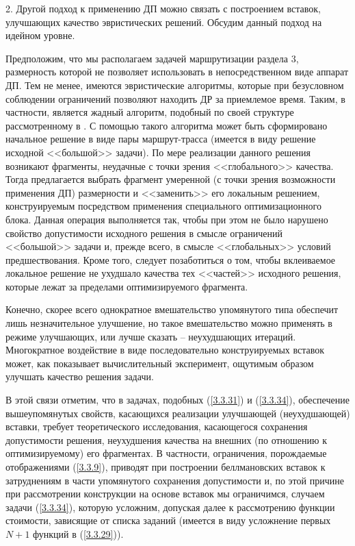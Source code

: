 \documentclass[11pt,twoside,openany]{report}
\begin{document}
{2. Другой подход к применению ДП можно связать с построением вставок, улучшающих
качество эвристических решений.
Обсудим данный подход на идейном уровне.

Предположим, что мы располагаем задачей маршрутизации раздела 3,
размерность
которой не позволяет использовать в непосредственном виде аппарат ДП.
Тем не
менее, имеются эвристические  алгоритмы, которые
при безусловном соблюдении ограничений
позволяют находить ДР за приемлемое время.
Таким, в частности,
является жадный алгоритм, подобный по своей структуре рассмотренному в
\cite{Cha8`}.
С помощью такого алгоритма может быть сформировано начальное
решение в виде пары маршрут-трасса
(имеется в виду решение исходной <<большой>> задачи).
По мере реализации данного решения возникают фрагменты,
неудачные с
точки зрения <<глобального>> качества.
Тогда предлагается выбрать фрагмент
умеренной
(с точки зрения возможности применения ДП)
размерности и <<заменить>>
его локальным решением, конструируемым посредством применения специального
оптимизационного блока.
Данная операция выполняется так,
чтобы при этом не было
нарушено свойство допустимости исходного решения
в смысле ограничений <<большой>>
задачи и, прежде всего, в смысле <<глобальных>> условий предшествования.
Кроме
того, следует позаботиться о том, чтобы вклеиваемое локальное решение не ухудшало
качества тех <<частей>> исходного решения,
которые лежат за пределами оптимизируемого фрагмента.

Конечно, скорее всего однократное вмешательство упомянутого типа обеспечит лишь
незначительное улучшение,
но такое вмешательство можно применять в режиме улучшающих,
или лучше сказать -- неухудшающих итераций.
Многократное воздействие в
виде последовательно конструируемых вставок может,
как показывает вычислительный эксперимент,
ощутимым образом
улучшать качество решения задачи.

В этой связи отметим, что в задачах,
подобных (\ref{3.3.31}) и (\ref{3.3.34}),
обеспечение вышеупомянутых свойств,
касающихся реализации улучшающей (неухудшающей)
вставки, требует теоретического исследования,
касающегося сохранения допустимости
решения, неухудшения качества на внешних
(по отношению к оптимизируемому)
его фрагментах.
В частности, ограничения, порождаемые отображениями (\ref{3.3.9}),
приводят при построении беллмановских вставок
к затруднениям в части упомянутого
сохранения допустимости и, по этой причине
при рассмотрении
конструкции на основе вставок
мы ограничимся,
случаем задачи (\ref{3.3.34}),
которую
усложним, допуская далее к рассмотрению функции стоимости,
зависящие от списка заданий
(имеется в виду усложнение первых $N+1$ функций в (\ref{3.3.29})).

}
\end{document}
